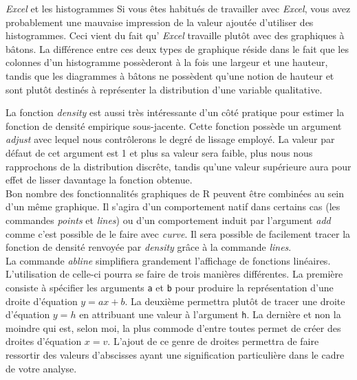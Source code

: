 \begin{moreInfo}{\emph{Excel} et les histogrammes}
	Si vous êtes habitués de travailler avec \emph{Excel}, vous avez probablement une mauvaise impression de la valeur ajoutée d'utiliser des histogrammes. Ceci vient du fait qu’ \emph{Excel} travaille plutôt avec des graphiques à bâtons. La différence entre ces deux types de graphique réside dans le fait que les colonnes d'un histogramme possèderont à la fois une largeur et une hauteur, tandis que les diagrammes à bâtons ne possèdent qu'une notion de hauteur et sont plutôt destinés à représenter la distribution d'une variable qualitative. 
\end{moreInfo}

La fonction \emph{density} \cite{Rfunction:density} est aussi très intéressante d'un côté pratique pour estimer la fonction de densité empirique sous-jacente. Cette fonction possède un argument \emph{adjust} avec lequel nous contrôlerons le degré de lissage employé. La valeur par défaut de cet argument est 1 et plus sa valeur sera faible, plus nous nous rapprochons de la distribution discrête, tandis qu'une valeur supérieure aura pour effet de lisser davantage la fonction obtenue. \\

Bon nombre des fonctionnalités graphiques de R peuvent être combinées au sein d'un même graphique. Il s'agira d'un comportement natif dans certains cas (les commandes \emph{points} et \emph{lines}) ou d'un comportement induit par l'argument \emph{add} comme c'est possible de le faire avec \emph{curve}. Il sera possible de facilement tracer la fonction de densité renvoyée par \emph{density} grâce à la commande \emph{lines}. \\

La commande \emph{abline} \cite{Rfunction:abline} simplifiera grandement l'affichage de fonctions linéaires. L'utilisation de celle-ci pourra se faire de trois manières différentes. La première consiste à spécifier les arguments \texttt{a} et \texttt{b} pour produire la représentation d'une droite d'équation $y = ax + b$. La deuxième permettra plutôt de tracer une droite d'équation $y = h$ en attribuant une valeur à l'argument \texttt{h}. La dernière et non la moindre qui est, selon moi, la plus commode d'entre toutes permet de créer des droites d'équation $x = v$. L'ajout de ce genre de droites permettra de faire ressortir des valeurs d'abscisses ayant une signification particulière dans le cadre de votre analyse. \\


